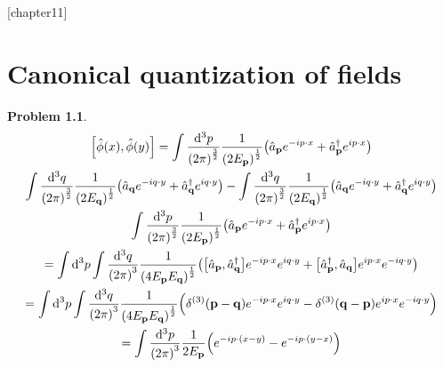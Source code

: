 \documentclass{report}
\theoremstyle{definition}
\begin{document}
\newtheorem{chapter11}{Problem}
[chapter11]
\chapter{Canonical quantization of fields}

\begin{chapter11}
	\begin{gather*}
		\bqty{\hat{\phi}(x),\hat{\phi}(y)} = \int \frac{\dd^3{p}}{\pqty{2\pi}^{\frac{3}{2}}}\frac{1}{\pqty{2E_{\bf p}}^{\frac{1}{2}}}\pqty{\hat{a}_{\bf p}e^{-ip\cdot x} + \hat{a}^{\dagger}_{\bf p}e^{ip\cdot x}} \\
		\int \frac{\dd^3{q}}{\pqty{2\pi}^{\frac{3}{2}}}\frac{1}{\pqty{2E_{\bf q}}^{\frac{1}{2}}}\pqty{\hat{a}_{\bf q}e^{-iq\cdot y} + \hat{a}^{\dagger}_{\bf q}e^{iq\cdot y}} - \int \frac{\dd^3{q}}{\pqty{2\pi}^{\frac{3}{2}}}\frac{1}{\pqty{2E_{\bf q}}^{\frac{1}{2}}}\pqty{\hat{a}_{\bf q}e^{-iq\cdot y} + \hat{a}^{\dagger}_{\bf q}e^{iq\cdot y}} \\
		\int \frac{\dd^3{p}}{\pqty{2\pi}^{\frac{3}{2}}}\frac{1}{\pqty{2E_{\bf p}}^{\frac{1}{2}}}\pqty{\hat{a}_{\bf p}e^{-ip\cdot x} + \hat{a}^{\dagger}_{\bf p}e^{ip\cdot x}} \\
		= \int \dd^3{p}\int \frac{\dd^3{q}}{\pqty{2\pi}^3}\frac{1}{\pqty{4E_{\bf p}E_{\bf q}}^{\frac{1}{2}}}\pqty{\bqty{\hat{a}_{\bf p},\hat{a}^{\dagger}_{\bf q}}e^{-ip\cdot x}e^{iq\cdot y} + \bqty{\hat{a}^{\dagger}_{\bf p},\hat{a}_{\bf q}}e^{ip\cdot x}e^{-iq\cdot y}} \\
		= \int \dd^3{p}\int \frac{\dd^3{q}}{\pqty{2\pi}^3}\frac{1}{\pqty{4E_{\bf p}E_{\bf q}}^{\frac{1}{2}}}\pqty{\delta^{(3)}\pqty{\bf p - q}e^{-ip\cdot x}e^{iq\cdot y} - \delta^{(3)}\pqty{\bf q - p}e^{ip\cdot x}e^{-iq\cdot y}} \\
		= \int\frac{\dd^3{p}}{\pqty{2\pi}^3}\frac{1}{2E_{\bf p}}\pqty{e^{-ip\cdot(x-y)} - e^{-ip\cdot(y-x)}}
	\end{gather*}
\end{chapter11}
\end{document}
